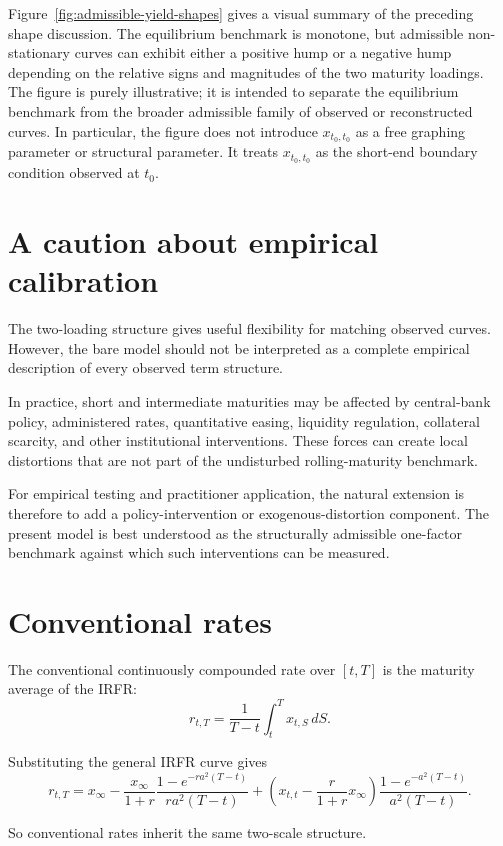 \documentclass[11pt]{article}
\theoremstyle{plainbreak}
\begin{document}
Figure~\ref{fig:admissible-yield-shapes} gives a visual summary of the preceding shape discussion. The equilibrium benchmark is monotone, but admissible non-stationary curves can exhibit either a positive hump or a negative hump depending on the relative signs and magnitudes of the two maturity loadings. The figure is purely illustrative; it is intended to separate the equilibrium benchmark from the broader admissible family of observed or reconstructed curves. In particular, the figure does not introduce \(x_{t_0,t_0}\) as a free graphing parameter or structural parameter. It treats \(x_{t_0,t_0}\) as the short-end boundary condition observed at \(t_0\).

\section{A caution about empirical calibration}

The two-loading structure gives useful flexibility for matching observed curves. However, the bare model should not be interpreted as a complete empirical description of every observed term structure.

In practice, short and intermediate maturities may be affected by central-bank policy, administered rates, quantitative easing, liquidity regulation, collateral scarcity, and other institutional interventions. These forces can create local distortions that are not part of the undisturbed rolling-maturity benchmark.

For empirical testing and practitioner application, the natural extension is therefore to add a policy-intervention or exogenous-distortion component. The present model is best understood as the structurally admissible one-factor benchmark against which such interventions can be measured.

\section{Conventional rates}

The conventional continuously compounded rate over \([t,T]\) is the maturity average of the IRFR:
\[
r_{t,T}=\frac{1}{T-t}\int_t^T x_{t,S}\,dS.
\]

Substituting the general IRFR curve gives
\[
r_{t,T}
=
x_\infty
-
\frac{x_\infty}{1+r}\frac{1-e^{-ra^2(T-t)}}{ra^2(T-t)}
+
\left(x_{t,t}-\frac{r}{1+r}x_\infty\right)
\frac{1-e^{-a^2(T-t)}}{a^2(T-t)}.
\]

So conventional rates inherit the same two-scale structure.
\end{document}
